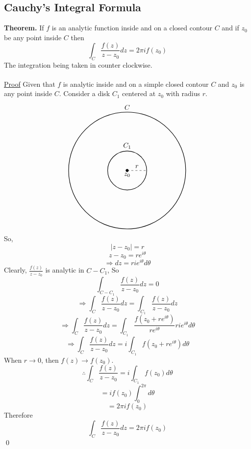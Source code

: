 \documentclass{article}
\begin{document}
\subsection{Cauchy's Integral Formula}
\textbf{Theorem.} If $f$ is an analytic function inside and on a closed contour $C$ and if $z_0$ be any point inside $C$ then
\[
\int_{C}\frac{f(z)}{z-z_0}dz=2\pi if(z_0)
\]
The integration being taken in counter clockwise.
\\
\\
\underline{Proof} Given that $f$ is analytic inside and on a simple closed contour $C$ and $z_0$ is any point inside $C$. Consider a disk $C_1$ centered at $z_0$ with radius $r$.
\[
\begin{tikzpicture}
    \draw[thick] (0,0) circle (3cm);
    \node[above] at (0,3) {$C$};
    
    \draw[thick] (0,0) circle (1cm);
    \node[above] at (0,1) {$C_1$};
    
    \filldraw[black] (0,0) circle (2pt) node[below] {$z_0$};
    
    \draw[dashed] (0,0) -- (1,0) node[midway, above] {$r$};
    
\end{tikzpicture}
\]
So, 
\[
|z-z_0|=r
\]
\[
z-z_0=re^{i\theta}
\]
\[
\Rightarrow dz=rie^{i\theta}d\theta
\]
Clearly, $\frac{f(z)}{z-z_0}$ is analytic in $C-C_1$, So
\[
\int_{C-C_1}\frac{f(z)}{z-z_0}dz=0
\]
\[
\Rightarrow \int_{C}\frac{f(z)}{z-z_0}dz=\int_{C_1}\frac{f(z)}{z-z_0}dz
\]
\[
\Rightarrow \int_{C}\frac{f(z)}{z-z_0}dz=\int_{C_1}\frac{f(z_0+re^{i\theta})}{re^{i\theta}}rie^{i\theta}d\theta
\]
\[
\Rightarrow \int_{C}\frac{f(z)}{z-z_0}dz = i\int_{C_1}f(z_0+re^{i\theta})d\theta
\]
When $r\to 0$, then $f(z)\to f(z_0)$.
\[
\therefore \int_{C}\frac{f(z)}{z-z_0}=i\int_{C_1}f(z_0)d\theta
\]
\[
=if(z_0)\int_{0}^{2\pi}d\theta
\]
\[
=2\pi if(z_0)
\]
Therefore \[
\boxed{\displaystyle\int_{C}\frac{f(z)}{z-z_0}dz=2\pi if(z_0)}
\]
\qed
\end{document}
